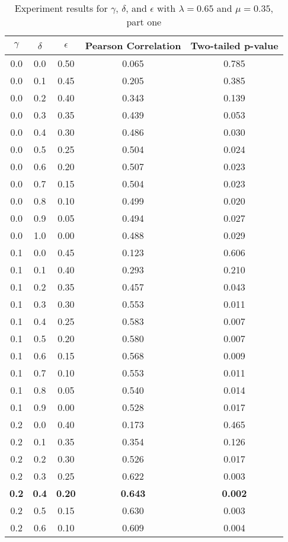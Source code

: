 \documentclass{article}
\begin{document}
\begin{table}[h!]
\caption{Experiment results for $\gamma$, $\delta$, and $\epsilon$ with $\lambda = 0.65$ and $\mu = 0.35$, part one}
\centering
\begin{tabular}{|c|c|c||c|c|}
	\hline
	$\gamma$ & $\delta$ & $\epsilon$ & Pearson Correlation & Two-tailed p-value \\
	\hline
	\hline
	0.0 & 0.0 & 0.50 & 0.065 & 0.785 \\
	0.0 & 0.1 & 0.45 & 0.205 & 0.385 \\
	0.0 & 0.2 & 0.40 & 0.343 & 0.139 \\
	0.0 & 0.3 & 0.35 & 0.439 & 0.053 \\
	0.0 & 0.4 & 0.30 & 0.486 & 0.030 \\ 
	0.0 & 0.5 & 0.25 & 0.504 & 0.024 \\
	0.0 & 0.6 & 0.20 & 0.507 & 0.023 \\
	0.0 & 0.7 & 0.15 & 0.504 & 0.023 \\
	0.0 & 0.8 & 0.10 & 0.499 & 0.020 \\
	0.0 & 0.9 & 0.05 & 0.494 & 0.027 \\
	0.0 & 1.0 & 0.00 & 0.488 & 0.029 \\
	\hline
	0.1 & 0.0 & 0.45 & 0.123 & 0.606 \\
	0.1 & 0.1 & 0.40 & 0.293 & 0.210 \\
	0.1 & 0.2 & 0.35 & 0.457 & 0.043 \\
	0.1 & 0.3 & 0.30 & 0.553 & 0.011 \\
	0.1 & 0.4 & 0.25 & 0.583 & 0.007 \\
	0.1 & 0.5 & 0.20 & 0.580 & 0.007 \\
	0.1 & 0.6 & 0.15 & 0.568 & 0.009 \\
	0.1 & 0.7 & 0.10 & 0.553 & 0.011 \\
	0.1 & 0.8 & 0.05 & 0.540 & 0.014 \\
	0.1 & 0.9 & 0.00 & 0.528 & 0.017 \\
	\hline
	0.2 & 0.0 & 0.40 & 0.173 & 0.465 \\
	0.2 & 0.1 & 0.35 & 0.354 & 0.126 \\
	0.2 & 0.2 & 0.30 & 0.526 & 0.017 \\
	0.2 & 0.3 & 0.25 & 0.622 & 0.003 \\
	\textbf{0.2} & \textbf{0.4} & \textbf{0.20} & \textbf{0.643} & \textbf{0.002} \\
	0.2 & 0.5 & 0.15 & 0.630 & 0.003 \\
	0.2 & 0.6 & 0.10 & 0.609 & 0.004 \\

\end{tabular}
\end{table}
\end{document}
